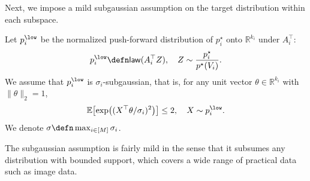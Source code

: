 Next, we impose a mild subgaussian assumption on the target distribution within each subspace.
%
\begin{assumption}
    \label{assump:sub-gaussian target}
    Let $p_i^\low$ be the normalized push-forward distribution of $p_i^\star$ onto $\mathbb{R}^{k_i}$ under $A_i^{\top}$: 
    \begin{align}
        p_i^\low \defn \mathsf{law}(A_i^{\top}Z), \quad Z \sim \frac{p_i^\star}{p^\star(V_i)}. \label{eq:dist in each low-dim}
    \end{align}
    We assume that $p_i^\low$ is $\sigma_i$-subgaussian, that is, for any unit vector $\theta \in \mathbb{R}^{k_i}$ with $\|\theta\|_2 = 1$,
    \begin{align*}
        \mathbb{E} \bigl[\exp\bigl( (X^{\top}\theta/\sigma_i)^2\bigr)\bigr] \leq 2, \quad X \sim p_i^\low.
    \end{align*}
    We denote $\sigma \defn \max_{i\in [M]} \sigma_i$.
\end{assumption}

The subgaussian assumption is fairly mild in the sense that it subsumes any distribution with bounded support, which covers a wide range of practical data such as image data. 

